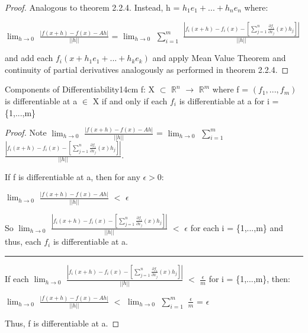     \begin{proof}
        Analogous to {\color{red} theorem 2.2.4}.
        Instead, h = $h_1e_1 + ... + h_ne_n$ where:

        \hspace{0.5cm}
        $\lim_{h \rightarrow 0}$ $\frac{|f(x+h)-f(x)-Ah|}{||h||}$
        = $\lim_{h \rightarrow 0}$ $\sum_{i=1}^m$
            $\frac{|f_i(x+h) - f_i(x)
                    - [\sum_{j=1}^n \frac{\partial f_i}{\partial x_j}(x)h_j]|}
                {||h||}$
        
        and add each $f_i(x+h_1e_1+...+h_ke_k)$ and apply Mean Value Theorem
        and continuity of partial derivatives analogously as performed in
        {\color{red} theorem 2.2.4}.
    \end{proof}

    \vspace{0.5cm}



    \begin{wtheorem}{Components of Differentiability}{14cm}
        f: X $\subset$ $\mathbb{R}^n$ $\rightarrow$ $\mathbb{R}^m$
        where f = $(f_1,...,f_m)$ is differentiable at a $\in$ X if and only if
        each $f_i$ is differentiable at a for i = \{1,...,m\}
    \end{wtheorem}

    \begin{proof}
        Note
        $\lim_{h \rightarrow 0}$ $\frac{|f(x+h)-f(x)-Ah|}{||h||}$
        = $\lim_{h \rightarrow 0}$ $\sum_{i=1}^m$
            $\frac{|f_i(x+h) - f_i(x)
                    - [\sum_{j=1}^n \frac{\partial f_i}{\partial x_j}(x)h_j]|}
                {||h||}$.

        If f is differentiable at a, then for any $\epsilon > 0$:

        \hspace{0.5cm}
        $\lim_{h \rightarrow 0}$ $\frac{|f(x+h)-f(x)-Ah|}{||h||}$
        $<$ $\epsilon$

        So $\lim_{h \rightarrow 0}$
                $\frac{|f_i(x+h) - f_i(x)
                - [\sum_{j=1}^n \frac{\partial f_i}{\partial x_j}(x)h_j]|}{||h||}$
            $<$ $\epsilon$
        for each i = \{1,...,m\}
        and thus, each $f_i$ is differentiable at a.

        \rule[0.1cm]{15cm}{0.01cm}

        If each $\lim_{h \rightarrow 0}$
                $\frac{|f_i(x+h) - f_i(x)
                - [\sum_{j=1}^n \frac{\partial f_i}{\partial x_j}(x)h_j]|}{||h||}$
                $<$ $\frac{\epsilon}{m}$
        for i = \{1,...,m\}, then:

        \hspace{0.5cm}
        $\lim_{h \rightarrow 0}$ $\frac{|f(x+h)-f(x)-Ah|}{||h||}$
        $<$ $\lim_{h \rightarrow 0}$ $\sum_{i=1}^m$ $\frac{\epsilon}{m}$
        = $\epsilon$

        Thus, f is differentiable at a.
    \end{proof}

